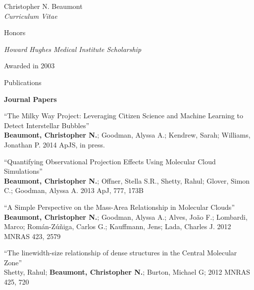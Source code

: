 \documentclass[10pt]{article}
\newenvironment{sublist}{%
	\begin{list}{}{%
		\setlength{\itemsep}{0em}\setlength{\parsep}{0em}%
		\setlength{\topsep}{0em}\setlength{\parskip}{0em}%
	}%
}%
{ \end{list} }
\begin{document}
\begin{cv}{Christopher N. Beaumont\\{\large \itshape Curriculum Vitae}}
\begin{cvlist}{Honors}
\item
	\emph{Howard Hughes Medical Institute Scholarship}
	\begin{sublist}
	\item Awarded in 2003
	\end{sublist}

\end{cvlist}


\setlength{\oldcvlabelwidth}{\cvlabelwidth}
\setlength{\cvlabelwidth}{1em}
\renewcommand*{\bibindent}{1.5em}
\newcommand*{\biblabelsep}{1.5em}


\begin{cvlist}{Publications}
	\item \textbf{Journal Papers}
	\begin{sublist}
	\item ``The Milky Way Project: Leveraging Citizen Science and Machine Learning to Detect Interstellar Bubbles''\\
	\textbf{Beaumont, Christopher N.}; Goodman, Alyssa A.; Kendrew, Sarah; Williams, Jonathan P. 2014 ApJS, in press. \\
	
	\item ``Quantifying Observational Projection Effects Using Molecular Cloud Simulations''\\
	\textbf{Beaumont, Christopher N.}; Offner, Stella S.R., Shetty, Rahul; Glover, Simon C.; Goodman, Alyssa A. 2013 ApJ, 777, 173B\\	
	\item ``A Simple Perspective on the Mass-Area Relationship in Molecular Clouds''\\
	\textbf{Beaumont, Christopher N.}; Goodman, Alyssa A.; Alves, Jo\~ao F.; Lombardi, Marco; Rom\'an-Z\'u\~niga, Carlos G.; Kauffmann, Jens; Lada, Charles J. 2012 MNRAS 423, 2579 \\
	
	\item ``The linewidth-size relationship of dense structures in the Central Molecular Zone''\\
	Shetty, Rahul; \textbf{Beaumont, Christopher N.}; Burton, Michael G; 2012 MNRAS 425, 720 \\
	

\end{sublist}
\end{cvlist}
\end{cv}
\end{document}
